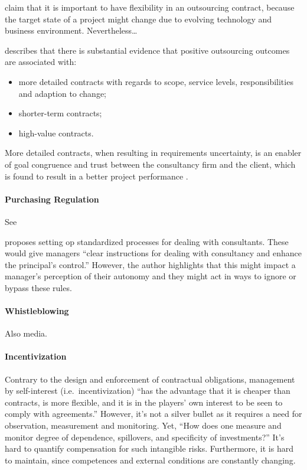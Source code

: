 \documentclass[12pt]{article}
\providecommand{\tightlist}{%
  \setlength{\itemsep}{0pt}\setlength{\parskip}{0pt}}
\begin{document}
\citet{mcfarlan1995} claim that it is important to have flexibility in
an outsourcing contract, because the target state of a project might
change due to evolving technology and business environment.
Nevertheless\ldots{}

\citet[4]{lacity2012} describes that there is substantial evidence that
positive outsourcing outcomes are associated with:

\begin{itemize}
\tightlist
\item
  more detailed contracts with regards to scope, service levels,
  responsibilities and adaption to change;
\item
  shorter-term contracts;
\item
  high-value contracts.
\end{itemize}

More detailed contracts, when resulting in requirements uncertainty, is
an enabler of goal congruence and trust between the consultancy firm and
the client, which is found to result in a better project performance
\citep[ 264]{liberatore2010}.

\hypertarget{purchasing-regulation}{%
\paragraph{Purchasing Regulation}\label{purchasing-regulation}}

See \citet[4-5]{sturdy2021}

\citet[307]{honer2006} proposes setting op standardized processes for
dealing with consultants. These would give managers ``clear instructions
for dealing with consultancy and enhance the principal's control.''
However, the author highlights that this might impact a manager's
perception of their autonomy and they might act in ways to ignore or
bypass these rules.

\hypertarget{whistleblowing}{%
\paragraph{Whistleblowing}\label{whistleblowing}}

Also media.

\hypertarget{incentivization}{%
\paragraph{Incentivization}\label{incentivization}}

Contrary to the design and enforcement of contractual obligations,
management by self-interest (i.e.~incentivization) ``has the advantage
that it is cheaper than contracts, is more flexible, and it is in the
players' own interest to be seen to comply with agreements.'' \citep[
924]{nooteboom2000} However, it's not a silver bullet as it requires a
need for observation, measurement and monitoring. Yet, ``How does one
measure and monitor degree of dependence, spillovers, and specificity of
investments?'' It's hard to quantify compensation for such intangible
risks. Furthermore, it is hard to maintain, since competences and
external conditions are constantly changing.
\end{document}
